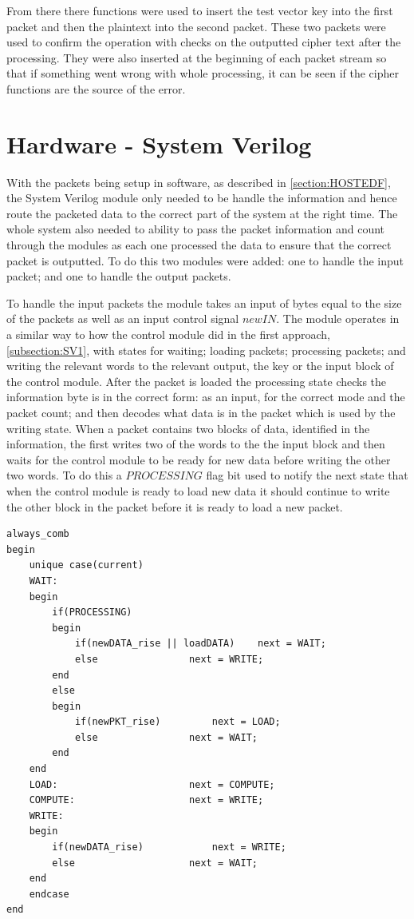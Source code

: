 \documentclass[12pt,twoside,a4paper]{report}
\begin{document}
	From there there functions were used to insert the test vector key into the first packet and then the plaintext into the second packet. These two packets were used to confirm the operation with checks on the outputted cipher text after the processing. They were also inserted at the beginning of each packet stream so that if something went wrong with whole processing, it can be seen if the cipher functions are the source of the error.
    
	\section{Hardware - System Verilog}
	\label{section:SVF}
		
	With the packets being setup in software, as described in \autoref{section:HOSTEDF}, the System Verilog module only needed to be handle the information and hence route the packeted data to the correct part of the system at the right time. The whole system also needed to ability to pass the packet information and count through the modules as each one processed the data to ensure that the correct packet is outputted. To do this two modules were added: one to handle the input packet; and one to handle the output packets.
	
	To handle the input packets the module takes an input of bytes equal to the size of the packets as well as an input control signal $newIN$. The module operates in a similar way to how the control module did in the first approach, \autoref{subsection:SV1}, with states for waiting; loading packets; processing packets; and writing the relevant words to the relevant output, the key or the input block of the control module. After the packet is loaded the processing state checks the information byte is in the correct form: as an input, for the correct mode and the packet count; and then decodes what data is in the packet which is used by the writing state. When a packet contains two blocks of data, identified in the information, the first writes two of the words to the the input block and then waits for the control module to be ready for new data before writing the other two words. To do this a $PROCESSING$ flag bit used to notify the next state that when the control module is ready to load new data it should continue to write the other block in the packet before it is ready to load a new packet.

 	\begin{minipage}{\linewidth}
	\begin{lstlisting}[label={lst:dataIN_next},caption={The next state logic used for the input packet handling module.},style=SVStyle]
always_comb
begin
	unique case(current)
	WAIT:
	begin
		if(PROCESSING)
		begin
			if(newDATA_rise || loadDATA)	next = WAIT;	
			else				next = WRITE;	
		end
		else
		begin
			if(newPKT_rise)			next = LOAD;
			else				next = WAIT;
		end
	end
	LOAD:						next = COMPUTE;
	COMPUTE:					next = WRITE;
	WRITE:
	begin
		if(newDATA_rise)			next = WRITE;
		else					next = WAIT;
	end
	endcase
end
	\end{lstlisting}
	\end{minipage}
	
\end{document}
